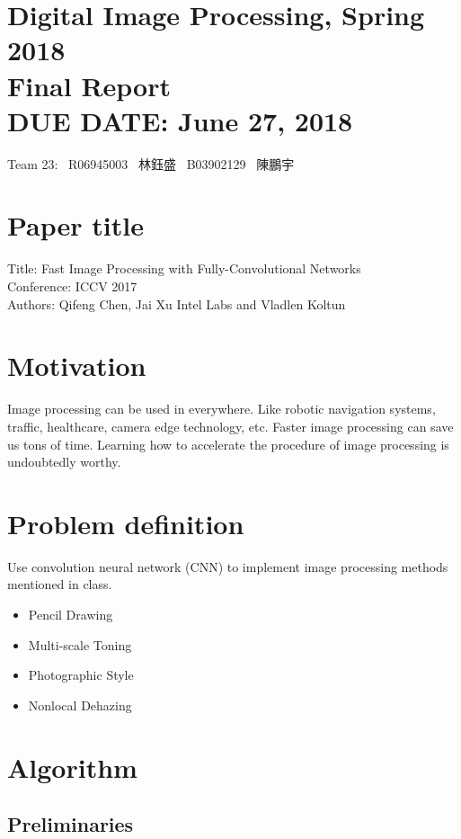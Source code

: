 \documentclass{article}
\newcommand{\hmwkClass}{Digital Image Processing, Spring 2018}
\newcommand{\hmwkTitle}{Final Report}
\newcommand{\hmwkDueDate}{June 27, 2018}
\begin{document}
\thispagestyle{empty}
\section*{\hmwkClass \\
    \normalsize{\hmwkTitle} \\
    \normalsize{DUE DATE: \hmwkDueDate}
}

\hfill{Team 23: \, R06945003 \, 林鈺盛 \, B03902129 \, 陳鵬宇} \\

\section*{Paper title}

Title: Fast Image Processing with Fully-Convolutional Networks \\
Conference: ICCV 2017 \\
Authors: Qifeng Chen, Jai Xu Intel Labs and Vladlen Koltun

\section*{Motivation}

Image processing can be used in everywhere. Like robotic navigation systems, traffic, healthcare, camera edge technology, etc. Faster image processing can save us tons of time. Learning how to accelerate the procedure of image processing is undoubtedly worthy.

\section*{Problem definition}

Use convolution neural network (CNN) to implement image processing methods mentioned in class.

\begin{itemize}
    \item Pencil Drawing
    \item Multi-scale Toning
    \item Photographic Style
    \item Nonlocal Dehazing
\end{itemize}

\section*{Algorithm}

\subsection*{Preliminaries}
\end{document}
